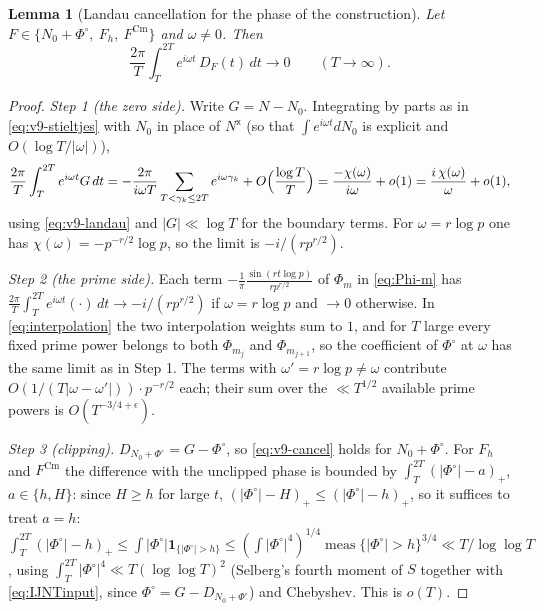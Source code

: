 \documentclass[11pt,a4paper]{article}
\numberwithin{equation}{section}
\newtheorem{lemma}[theorem]{Lemma}
\theoremstyle{definition}
\theoremstyle{remark}
\newcommand{\meas}{\operatorname{meas}}
\newcommand{\ind}{\mathbf 1}
\newcommand{\Cm}{\mathrm{Cm}}
\begin{document}
\begin{lemma}[Landau cancellation for the phase of the construction]\label{lem:v9-cancel}
Let $F\in\{N_0+\Phi^\circ,\ F_h,\ F^{\Cm}\}$ and $\omega\neq0$. Then
\begin{equation}\label{eq:v9-cancel}
\frac{2\pi}{T}\int_T^{2T}e^{i\omega t}\,D_F(t)\,dt\longrightarrow0\qquad(T\to\infty).
\end{equation}
\end{lemma}
\begin{proof}
\emph{Step 1 (the zero side).} Write $G=N-N_0$. Integrating by parts as in \eqref{eq:v9-stieltjes} with $N_0$ in place of $N^{\mathsf x}$ (so that $\int e^{i\omega t}dN_0$ is explicit and $O(\log T/|\omega|)$),
\begin{equation}
\frac{2\pi}{T}\int_T^{2T}e^{i\omega t}G\,dt=-\frac{2\pi}{i\omega T}\sum_{T<\gamma_k\le2T}e^{i\omega\gamma_k}+O\Bigl(\frac{\log T}{T}\Bigr)
=\frac{-\chi(\omega)}{i\omega}+o(1)
=\frac{i\,\chi(\omega)}{\omega}+o(1),
\end{equation}
using \eqref{eq:v9-landau} and $|G|\ll\log T$ for the boundary terms. For $\omega=r\log p$ one has $\chi(\omega)=-p^{-r/2}\log p$, so the limit is $-i/(rp^{r/2})$.

\emph{Step 2 (the prime side).} Each term $-\frac1\pi\frac{\sin(rt\log p)}{rp^{r/2}}$ of $\Phi_m$ in \eqref{eq:Phi-m} has $\frac{2\pi}T\int_T^{2T}e^{i\omega t}(\cdot)\,dt\to-i/(rp^{r/2})$ if $\omega=r\log p$ and $\to0$ otherwise. In \eqref{eq:interpolation} the two interpolation weights sum to $1$, and for $T$ large every fixed prime power belongs to both $\Phi_{m_j}$ and $\Phi_{m_{j+1}}$, so the coefficient of $\Phi^\circ$ at $\omega$ has the same limit as in Step 1. The terms with $\omega'=r\log p\ne\omega$ contribute $O(1/(T|\omega-\omega'|))\cdot p^{-r/2}$ each; their sum over the $\ll T^{1/2}$ available prime powers is $O(T^{-3/4+\epsilon})$.

\emph{Step 3 (clipping).} $D_{N_0+\Phi^\circ}=G-\Phi^\circ$, so \eqref{eq:v9-cancel} holds for $N_0+\Phi^\circ$. For $F_h$ and $F^{\Cm}$ the difference with the unclipped phase is bounded by $\int_T^{2T}(|\Phi^\circ|-a)_+$, $a\in\{h,H\}$: since $H\ge h$ for large $t$, $(|\Phi^\circ|-H)_+\le(|\Phi^\circ|-h)_+$, so it suffices to treat $a=h$: $\int_T^{2T}(|\Phi^\circ|-h)_+\le\int|\Phi^\circ|\ind_{\{|\Phi^\circ|>h\}}\le(\int|\Phi^\circ|^4)^{1/4}\meas\{|\Phi^\circ|>h\}^{3/4}\ll T/\log\log T$, using $\int_T^{2T}|\Phi^\circ|^4\ll T(\log\log T)^2$ (Selberg's fourth moment of $S$ \cite{Selberg1946,Fujii1974} together with \eqref{eq:IJNTinput}, since $\Phi^\circ=G-D_{N_0+\Phi^\circ}$) and Chebyshev. This is $o(T)$.
\end{proof}
\end{document}
